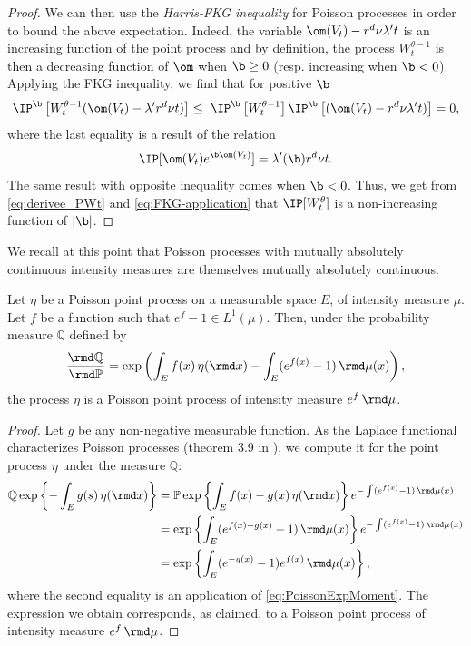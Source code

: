 \begin{proof}
We can then use the \emph{Harris-FKG inequality} for Poisson processes \cite[th. 11 p. 31]{Last2016} in order to bound the above expectation. Indeed, the variable $\om(V_t) - r^d \nu \lambda' t$ is an increasing function of the point process and by definition, the process $W_t^{\theta - 1}$ is then a decreasing function of $\om$ when $\b \geq 0$ (resp. increasing when $\b < 0$). Applying the FKG inequality, we find that for positive $\b$
\begin{equation} \label{eq:FKG-application}
\IP^\b \left[W_t^{\theta - 1} (\om(V_t) - \lambda' r^d \nu t ) \right ] \leq  \  \IP^\b \left[W_t^{\theta -1} \right] \IP^\b \left[(\om(V_t) - r^d \nu \lambda' t )\right] = 0,
\end{equation}
where the last equality is a result of the relation
\[\IP [\om(V_t) e^{\b \om(V_t)}] =  \lambda'(\b) r^d \nu t.\]
The same result with opposite inequality comes when $\b < 0$.
Thus, we get from \eqref{eq:derivee_PWt} and \eqref{eq:FKG-application} that $\IP[W_t^\theta]$ is a non-increasing function of $|\b|$.
\end{proof}
We recall at this point that Poisson processes with mutually absolutely continuous intensity measures are themselves mutually absolutely continuous.
\begin{proposition} \label{prop:PoissonGirsanov} Let $\eta$ be a Poisson point process on a measurable space $E$, of intensity measure $\mu$. Let $f$ be a function such that $e^f-1 \in L^1(\mu)$. Then, under the probability measure $\mathbb{Q}$ defined by 
\[ \frac{\rmd \mathbb{Q}}{\rmd \mathbb{P}} = \exp\left(\int_E f(x) \, \eta(\rmd x) - \int_E (e^{f(x)}-1) \, \rmd \mu(x)\right),\]
the process $\eta$ is a Poisson point process of intensity measure $e^f \, \rmd \mu$.
\end{proposition}
\begin{proof}
Let $g$ be any non-negative measurable function. As the Laplace functional characterizes Poisson processes (theorem 3.9 in \cite{LastPenrose}), we compute it for the point process $\eta$ under the measure $\mathbb{Q}$:
\begin{align*}
\mathbb{Q} \exp\left\{-\int_E g(s) \, \eta(\rmd x)\right\} & = \mathbb{P} \exp \left\{ \int_{E} f(x)-g(x) \, \eta(\rmd x) \right\} e^{ -\int (e^{f(x)}-1) \, \rmd \mu(x) } \\
& =  \exp \left\{ \int_{E} (e^{ f(x)-g(x)}-1) \, \rmd \mu(x) \right\} e^{ -\int (e^{f(x)}-1) \, \rmd \mu(x) }\\
& =  \exp \left\{ \int_{E} (e^{-g(x)}-1) e^{f(x)} \, \rmd \mu(x) \right\},\\
\end{align*}
where the second equality is an application of \eqref{eq:PoissonExpMoment}.
The expression we obtain corresponds, as claimed, to a Poisson point process of intensity measure $e^f \, \rmd \mu$.
\end{proof}


